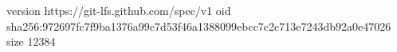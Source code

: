 version https://git-lfs.github.com/spec/v1
oid sha256:972697fc7f9ba1376a99c7d53f46a1388099ebcc7c2c713e7243db92a0e47026
size 12384
